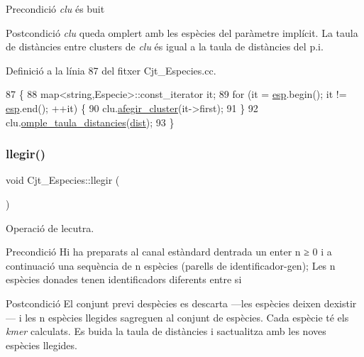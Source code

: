 \begin{DoxyPrecond}{Precondició}
{\itshape clu} és buit 
\end{DoxyPrecond}
\begin{DoxyPostcond}{Postcondició}
{\itshape clu} queda omplert amb les espècies del paràmetre implícit. La taula de distàncies entre clusters de {\itshape clu} és igual a la taula de distàncies del p.\+i. 
\end{DoxyPostcond}


Definició a la línia 87 del fitxer Cjt\+\_\+\+Especies.\+cc.


\begin{DoxyCode}
87                                                               \{
88     map<string,Especie>::const\_iterator it;
89     \textcolor{keywordflow}{for} (it = \hyperlink{class_cjt___especies_aa232ab8543b78ea6d8ecaa1e5f9ccef5}{esp}.begin(); it != \hyperlink{class_cjt___especies_aa232ab8543b78ea6d8ecaa1e5f9ccef5}{esp}.end(); ++it) \{
90         clu.\hyperlink{class_cjt___clusters_a195166b0ac52530dadc9c883c206a01c}{afegir\_cluster}(it->first);
91     \}
92     clu.\hyperlink{class_cjt___clusters_af1bf97b420bf3933bfe2ba9904e01241}{omple\_taula\_distancies}(\hyperlink{class_cjt___especies_aaf5d15b706e8b0c5b910283d60ef58a6}{dist});
93 \}
\end{DoxyCode}
\mbox{\label{class_cjt___especies_a2a0658d5acd67177881acc6f621fe2c0}} 
\subsubsection{\texorpdfstring{llegir()}{llegir()}}
{\footnotesize\ttfamily void Cjt\+\_\+\+Especies\+::llegir (\begin{DoxyParamCaption}{ }\end{DoxyParamCaption})}



Operació de lecutra. 

\begin{DoxyPrecond}{Precondició}
Hi ha preparats al canal estàndard d\textquotesingle{}entrada un enter n ≥ 0 i a continuació una sequència de n espècies (parells de identificador-\/gen); Les n espècies donades tenen identificadors diferents entre si 
\end{DoxyPrecond}
\begin{DoxyPostcond}{Postcondició}
El conjunt previ d\textquotesingle{}espècies es descarta —les espècies deixen d\textquotesingle{}existir— i les n espècies llegides s\textquotesingle{}agreguen al conjunt de espècies. Cada espècie té els {\itshape kmer} calculats. Es buida la taula de distàncies i s\textquotesingle{}actualitza amb les noves espècies llegides. 
\end{DoxyPostcond}


